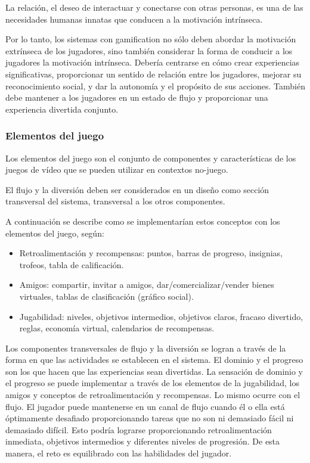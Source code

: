 La relación, el deseo de interactuar y conectarse con otras personas, es una de
las necesidades humanas innatas que conducen a la motivación
intrínseca\cite{framework:gamification}.

Por lo tanto, los sistemas con gamification no sólo deben abordar la motivación
extrínseca de los jugadores, sino también considerar la forma de conducir a los
jugadores la motivación intrínseca. Debería centrarse en cómo crear experiencias
significativas, proporcionar un sentido de relación entre los jugadores, mejorar
su reconocimiento social, y dar la autonomía y el propósito de sus acciones.
También debe mantener a los jugadores en un estado de flujo y proporcionar una
experiencia divertida conjunto\cite{framework:gamification}. 


\subsubsection{Elementos del juego}

Los elementos del juego son el conjunto de componentes y características de los
juegos de vídeo que se pueden utilizar en contextos
no-juego\cite{framework:gamification}.

El flujo y la diversión deben ser considerados en un diseño como sección
transversal del sistema, transversal a los otros
componentes\cite{framework:gamification}.

A continuación se describe como se implementarían estos conceptos con los elementos
del juego, según\cite{framework:gamification}:

\begin{itemize}
    \item Retroalimentación y recompensas: puntos, barras de progreso,
        insignias, trofeos, tabla de calificación.
    \item Amigos: compartir, invitar a amigos, dar/comercializar/vender bienes
        virtuales, tablas de clasificación (gráfico social).
    \item Jugabilidad: niveles, objetivos intermedios, objetivos claros, fracaso
        divertido, reglas, economía virtual, calendarios de recompensas.
\end{itemize}

Los componentes transversales de flujo y la diversión se logran a través de la
forma en que las actividades se establecen en el sistema. El dominio y el
progreso son los que hacen que las experiencias sean divertidas. La sensación de
dominio y el progreso se puede implementar a través de los elementos de la
jugabilidad, los amigos y conceptos de retroalimentación y recompensas. Lo mismo
ocurre con el flujo. El jugador puede mantenerse en un canal de flujo cuando él
o ella está óptimamente desafiado proporcionando tareas que no son ni demasiado
fácil ni demasiado difícil. Esto podría lograrse proporcionando
retroalimentación inmediata, objetivos intermedios y diferentes niveles de
progresión. De esta manera, el reto es equilibrado con las habilidades del
jugador\cite{framework:gamification}.

